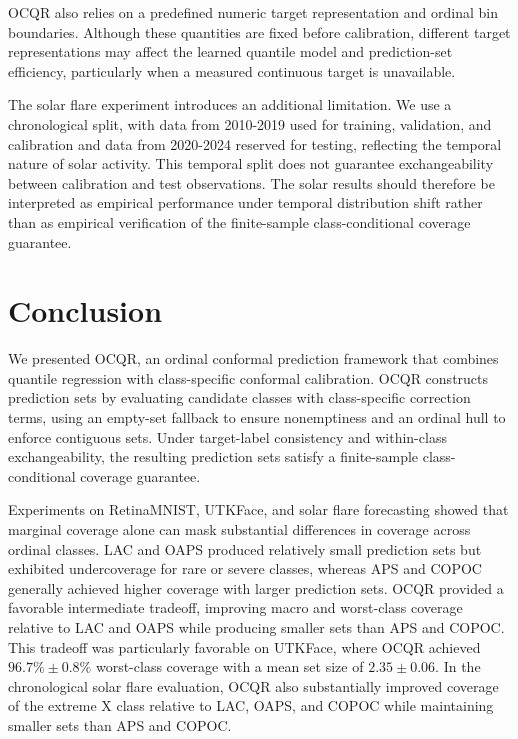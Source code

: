 \documentclass[conference]{IEEEtran}
\begin{document}
OCQR also relies on a predefined numeric target representation and ordinal bin boundaries. Although these quantities are fixed before calibration, different target representations may affect the learned quantile model and prediction-set efficiency, particularly when a measured continuous target is unavailable.

The solar flare experiment introduces an additional limitation. We use a chronological split, with data from 2010-2019 used for training, validation, and calibration and data from 2020-2024 reserved for testing, reflecting the temporal nature of solar activity. This temporal split does not guarantee exchangeability between calibration and test observations. The solar results should therefore be interpreted as empirical performance under temporal distribution shift rather than as empirical verification of the finite-sample class-conditional coverage guarantee.

\section{Conclusion}
\label{conclusion}

We presented OCQR, an ordinal conformal prediction framework that combines quantile regression with class-specific conformal calibration. OCQR constructs prediction sets by evaluating candidate classes with class-specific correction terms, using an empty-set fallback to ensure nonemptiness and an ordinal hull to enforce contiguous sets. Under target-label consistency and within-class exchangeability, the resulting prediction sets satisfy a finite-sample class-conditional coverage guarantee.

Experiments on RetinaMNIST, UTKFace, and solar flare forecasting showed that marginal coverage alone can mask substantial differences in coverage across ordinal classes. LAC and OAPS produced relatively small prediction sets but exhibited undercoverage for rare or severe classes, whereas APS and COPOC generally achieved higher coverage with larger prediction sets. OCQR provided a favorable intermediate tradeoff, improving macro and worst-class coverage relative to LAC and OAPS while producing smaller sets than APS and COPOC. This tradeoff was particularly favorable on UTKFace, where OCQR achieved \(96.7\%\pm0.8\%\) worst-class coverage with a mean set size of \(2.35\pm0.06\). In the chronological solar flare evaluation, OCQR also substantially improved coverage of the extreme X class relative to LAC, OAPS, and COPOC while maintaining smaller sets than APS and COPOC.
\end{document}
